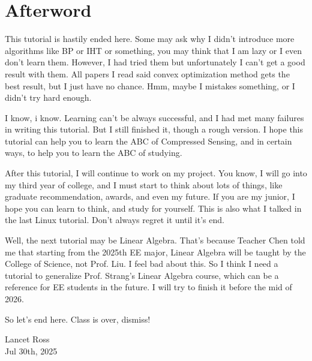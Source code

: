 \documentclass[12pt]{ctexart}
\begin{document}
\section*{\textbf{Afterword}}

This tutorial is hastily ended here. Some may ask why I didn't introduce more
algorithms like BP or IHT or something, you may think that I am lazy or I even don't
learn them. However, I had tried them but unfortunately I can't get a good result with
them. All papers I read said convex optimization method gets the best result, but I just
have no chance. Hmm,  maybe I mistakes something, or I didn't try hard enough.

I know, i know. Learning can't be always successful, and I had met many failures
in writing this tutorial. But I still finished it, though a rough version. I hope
this tutorial can help you to learn the ABC of Compressed Sensing, and in certain ways,
to help you to learn the ABC of studying.

After this tutorial, I will continue to work on my project. You know, I will go into
my third year of college, and I must start to think about lots of things, like
graduate recommendation, awards, and even my future. If you are my junior, I hope
you can learn to think, and study for yourself. This is also what I talked in the
last Linux tutorial. Don't always regret it until it's end.

Well, the next tutorial may be Linear Algebra. That's because Teacher Chen told me
that starting from the 2025th EE major, Linear Algebra will be taught by the College
of Science, not Prof. Liu. I feel bad about this. So I think I need a tutorial to
generalize Prof. Strang's Linear Algebra course, which can be a reference for
EE students in the future. I will try to finish it before the mid of 2026.

So let's end here. Class is over, dismiss!

\begin{flushright}
  Lancet Ross\\
  Jul 30th, 2025
\end{flushright}

\newpage
\end{document}
